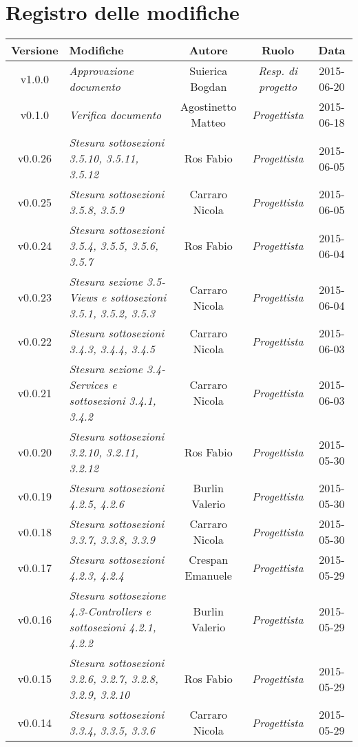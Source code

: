 \newpage
\section*{Registro delle modifiche}

\begin{table}[h]
\centering
\begin{tabular}{|c|p{}|c|c|c|}
	\toprule
		\textbf{Versione} & \textbf{Modifiche} & \textbf{Autore} & \textbf{Ruolo} & \textbf{Data}\\
	\midrule
	\midrule
	v1.0.0 & \textit{Approvazione documento} & Suierica Bogdan & \textit{Resp. di progetto} & 2015-06-20\\
	\midrule
	v0.1.0 & \textit{Verifica documento} & Agostinetto Matteo & \textit{Progettista} & 2015-06-18\\	
	\midrule
	v0.0.26 & \textit{Stesura sottosezioni 3.5.10, 3.5.11, 3.5.12} & Ros Fabio & \textit{Progettista} & 2015-06-05\\
	\midrule
	v0.0.25 & \textit{Stesura sottosezioni 3.5.8, 3.5.9} & Carraro Nicola & \textit{Progettista} & 2015-06-05\\
	\midrule
	v0.0.24 & \textit{Stesura sottosezioni 3.5.4, 3.5.5, 3.5.6, 3.5.7} & Ros Fabio & \textit{Progettista} & 2015-06-04\\
	\midrule
	v0.0.23 & \textit{Stesura sezione 3.5-Views e sottosezioni 3.5.1, 3.5.2, 3.5.3} & Carraro Nicola & \textit{Progettista} & 2015-06-04\\
	\midrule
	v0.0.22 & \textit{Stesura sottosezioni 3.4.3, 3.4.4, 3.4.5} & Carraro Nicola & \textit{Progettista} & 2015-06-03\\
	\midrule
	v0.0.21 & \textit{Stesura sezione 3.4-Services e sottosezioni 3.4.1, 3.4.2} & Carraro Nicola & \textit{Progettista} & 2015-06-03\\
	\midrule
	v0.0.20 & \textit{Stesura sottosezioni 3.2.10, 3.2.11, 3.2.12} & Ros Fabio & \textit{Progettista} & 2015-05-30\\
	\midrule
	v0.0.19 & \textit{Stesura sottosezioni 4.2.5, 4.2.6} & Burlin Valerio & \textit{Progettista} & 2015-05-30\\
	\midrule
	v0.0.18 & \textit{Stesura sottosezioni 3.3.7, 3.3.8, 3.3.9} & Carraro Nicola & \textit{Progettista} & 2015-05-30\\
	\midrule
	v0.0.17 & \textit{Stesura sottosezioni 4.2.3, 4.2.4} & Crespan Emanuele & \textit{Progettista} & 2015-05-29\\
	\midrule
	v0.0.16 & \textit{Stesura sottosezione 4.3-Controllers e sottosezioni 4.2.1, 4.2.2} & Burlin Valerio & \textit{Progettista} & 2015-05-29\\
	\midrule
		v0.0.15 & \textit{Stesura sottosezioni 3.2.6, 3.2.7, 3.2.8, 3.2.9, 3.2.10} & Ros Fabio & \textit{Progettista} & 2015-05-29\\
	\midrule
		v0.0.14 & \textit{Stesura sottosezioni 3.3.4, 3.3.5, 3.3.6} & Carraro Nicola & \textit{Progettista} & 2015-05-29\\
	\bottomrule
\end{tabular}
\end{table}
